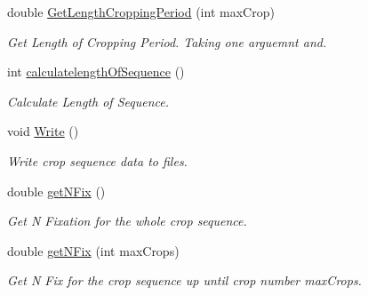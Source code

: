 \begin{DoxyCompactItemize}
double \mbox{\hyperlink{class_crop_sequence_class_a53a1fba19a3f7194449b74c643927437}{Get\+Length\+Cropping\+Period}} (int max\+Crop)
\begin{DoxyCompactList}\small\item\em Get Length of Cropping Period. Taking one arguemnt and. \end{DoxyCompactList}\item 
\mbox{\label{class_crop_sequence_class_a8ea5e635a7e942c936d23f7e9e9ba840}} 
int \mbox{\hyperlink{class_crop_sequence_class_a8ea5e635a7e942c936d23f7e9e9ba840}{calculatelength\+Of\+Sequence}} ()
\begin{DoxyCompactList}\small\item\em Calculate Length of Sequence. \end{DoxyCompactList}\item 
\mbox{\label{class_crop_sequence_class_aba8e1ea5cc4812106e2b2fbeb0d9b157}} 
void \mbox{\hyperlink{class_crop_sequence_class_aba8e1ea5cc4812106e2b2fbeb0d9b157}{Write}} ()
\begin{DoxyCompactList}\small\item\em Write crop sequence data to files. \end{DoxyCompactList}\item 
\mbox{\label{class_crop_sequence_class_a6a457da282f25f876f72361627966d8b}} 
double \mbox{\hyperlink{class_crop_sequence_class_a6a457da282f25f876f72361627966d8b}{get\+N\+Fix}} ()
\begin{DoxyCompactList}\small\item\em Get N Fixation for the whole crop sequence. \end{DoxyCompactList}\item 
\mbox{\label{class_crop_sequence_class_af712de3da9cee75cd72099d132d9ce4f}} 
double \mbox{\hyperlink{class_crop_sequence_class_af712de3da9cee75cd72099d132d9ce4f}{get\+N\+Fix}} (int max\+Crops)
\begin{DoxyCompactList}\small\item\em Get N Fix for the crop sequence up until crop number max\+Crops. \end{DoxyCompactList}\item 
\mbox{\label{class_crop_sequence_class_ae39925ea474556830b1d10d17ba8637a}} 

\end{DoxyCompactItemize}
